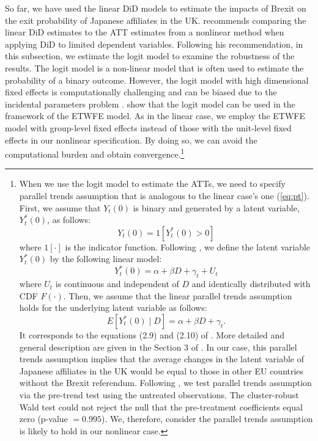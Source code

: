 \documentclass[preprint,11pt,authoryear]{elsarticle}
\begin{document}
So far, we have used the linear DiD models to estimate the impacts of Brexit on the exit probability of Japanese affiliates in the UK.
\cite{wooldridge2023simple} recommends comparing the linear DiD estimates to the ATT estimates from a nonlinear method when applying DiD to limited dependent variables.
Following his recommendation, in this subsection, we estimate the logit model to examine the robustness of the results.
The logit model is a non-linear model that is often used to estimate the probability of a binary outcome. 
However, the logit model with high dimensional fixed effects is computationally challenging and can be biased due to the incidental parameters problem \citep{fernandez2009fixed, fernandez2018fixed}.
\cite{wooldridge2021two, wooldridge2023simple} show that the logit model can be used in the framework of the ETWFE model. 
As in the linear case, we employ the ETWFE model with group-level fixed effects instead of those with the unit-level fixed effects in our nonlinear specification.
By doing so, we can avoid the computational burden and obtain convergence.\footnote{When we use the logit model to estimate the ATTs, we need to specify parallel trends assumption that is analogous to the linear case's one (\ref{eq:pt}). First, we assume that $Y_{t}(0)$ is binary and generated by a latent variable, $Y_{t}^{*}(0)$, as follows:
$$
Y_{t}(0)=1\left[Y_{t}^{*}(0)>0\right]
$$
where $1[\cdot]$ is the indicator function.
Following \cite{wooldridge2023simple}, we define the latent variable $Y_{t}^{*}(0)$ by the following linear model:
\begin{equation}
Y_{t}^{*}(0)=\alpha + \beta D +\gamma_{t}+U_{t}
\end{equation}
where $U_{t}$ is continuous and independent of $D$ and identically distributed with CDF $F(\cdot)$. Then, we assume that the linear parallel trends assumption holds for the underlying latent variable as follows:
\begin{equation}
  E\left[Y_{t}^{*}(0) \mid D\right]=\alpha+\beta D+\gamma_{t}.
\end{equation}
It corresponds to the equations (2.9) and (2.10) of \cite{wooldridge2023simple}.
More detailed and general description are given in the Section 3 of \cite{wooldridge2023simple}.
In our case, this parallel trends assumption implies that the average changes in the latent variable of Japanese affiliates in the UK would be equal to those in other EU countries without the Brexit referendum.
Following \cite{wooldridge2023simple}, we test parallel trends assumption via the pre-trend test using the untreated observations. 
The cluster-robust Wald test could not reject the null that the pre-treatment coefficients equal zero (p-value $= 0.995$).
We, therefore, consider the parallel trends assumption is likely to hold in our nonlinear case.
}
\end{document}
